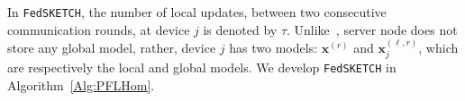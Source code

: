 \documentclass[11pt]{article}
\begin{document}
In \texttt{FedSKETCH}, the number of local updates, between two consecutive communication rounds, at device $j$ is denoted by $\tau$.
 Unlike~\citet{haddadpour2020federated}, server node does not store any global model, rather, device $j$ has two models: $\boldsymbol{x}^{(r)}$ and $\boldsymbol{x}^{(\ell,r)}_j$, which are respectively the local and global models. 
%
We develop \texttt{FedSKETCH} in Algorithm~\ref{Alg:PFLHom}. 
\end{document}
